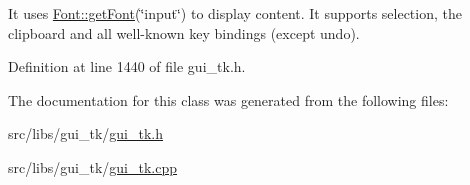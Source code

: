 It uses \hyperlink{classGUI_1_1Font_a19c023d747809a4cfa6142d33bdff53a}{Font\-::get\-Font}(\char`\"{}input\char`\"{}) to display content. It supports selection, the clipboard and all well-\/known key bindings (except undo). 

Definition at line 1440 of file gui\-\_\-tk.\-h.



The documentation for this class was generated from the following files\-:\begin{DoxyCompactItemize}
\item 
src/libs/gui\-\_\-tk/\hyperlink{gui__tk_8h}{gui\-\_\-tk.\-h}\item 
src/libs/gui\-\_\-tk/\hyperlink{gui__tk_8cpp}{gui\-\_\-tk.\-cpp}\end{DoxyCompactItemize}
